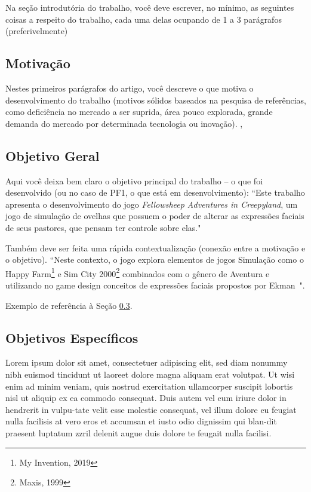 Na seção introdutória do trabalho, você deve escrever, no mínimo, as seguintes coisas a respeito do trabalho, cada uma delas ocupando de 1 a 3 parágrafos (preferivelmente) 

\subsection{Motivação}
\label{secao:motivacao}
Nestes primeiros parágrafos do artigo, você descreve o que motiva o desenvolvimento do trabalho (motivos sólidos baseados na pesquisa de referências, como deficiência no mercado a ser suprida, área pouco explorada, grande demanda do mercado por determinada tecnologia ou inovação)\cite{notes2002}.  \cite{AIGAMEDEV}, \cite{thestrong:2016}

\subsection{Objetivo Geral}
\label{secao:objetivo_geral}

Aqui você deixa bem claro o objetivo principal do trabalho -- o que foi desenvolvido (ou no caso de PF1, o que está em desenvolvimento): ``Este trabalho apresenta o desenvolvimento do jogo \emph{Fellowsheep Adventures in Creepyland}, um jogo de simulação de ovelhas que possuem o poder de alterar as expressões faciais de seus pastores, que pensam ter controle sobre elas." 

Também deve ser feita uma rápida contextualização (conexão entre a motivação e o objetivo). ``Neste contexto, o jogo explora elementos de jogos Simulação como o Happy Farm\footnote{My Invention, 2019} e Sim City 2000\footnote{Maxis, 1999} combinados com o gênero de Aventura e utilizando no game design conceitos de expressões faciais propostos por Ekman~\cite{Ekman:1978}".

Exemplo de referência à Seção \ref{secao:objetivos_especificos}.

\subsection{Objetivos Específicos}
\label{secao:objetivos_especificos}
Lorem ipsum dolor sit amet, consectetuer adipiscing elit, sed diam nonummy nibh euismod tincidunt ut laoreet dolore magna aliquam erat volutpat. Ut wisi enim ad minim veniam, quis nostrud exercitation ullamcorper suscipit lobortis nisl ut aliquip ex ea commodo consequat. Duis autem vel eum iriure dolor in hendrerit in vulpu-tate velit esse molestie consequat, vel illum dolore eu feugiat nulla facilisis at vero eros et accumsan et iusto odio dignissim qui blan-dit praesent luptatum zzril delenit augue duis dolore te feugait nulla facilisi.

